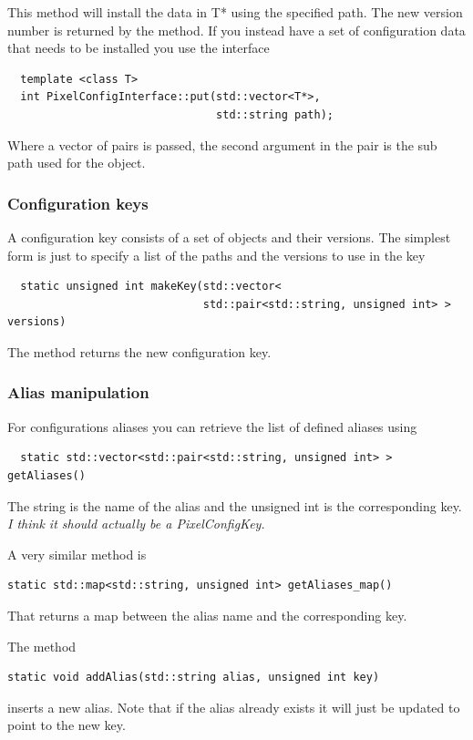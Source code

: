 This method will install the data in T* using the specified path.
The new version number is returned by the method.
If you instead have a set of configuration data that needs to be
installed you use the interface

\begin{verbatim}
  template <class T>
  int PixelConfigInterface::put(std::vector<T*>,
                                std::string path);
\end{verbatim}

Where a vector of pairs is passed, the second argument in the
pair is the sub path used for the object.

\subsubsection{Configuration keys}

A configuration key consists of a set of objects and their versions.
The simplest form is just to specify a list of the paths and the 
versions to use in the key
\begin{verbatim}
  static unsigned int makeKey(std::vector<
                              std::pair<std::string, unsigned int> > versions)
\end{verbatim}
The method returns the new configuration key.


\subsubsection{Alias manipulation}

For configurations aliases you can retrieve the list of defined 
aliases using
\begin{verbatim}
  static std::vector<std::pair<std::string, unsigned int> > getAliases()
\end{verbatim}
The string is the name of the alias and the unsigned int is the 
corresponding key. {\it I think it should actually be a PixelConfigKey.}

A very similar method is
\begin{verbatim}
static std::map<std::string, unsigned int> getAliases_map()
\end{verbatim}
That returns a map between the alias name and the corresponding key.

The method
\begin{verbatim}
static void addAlias(std::string alias, unsigned int key)
\end{verbatim}
inserts a new alias. Note that if the alias already exists it will
just be updated to point to the new key. 


